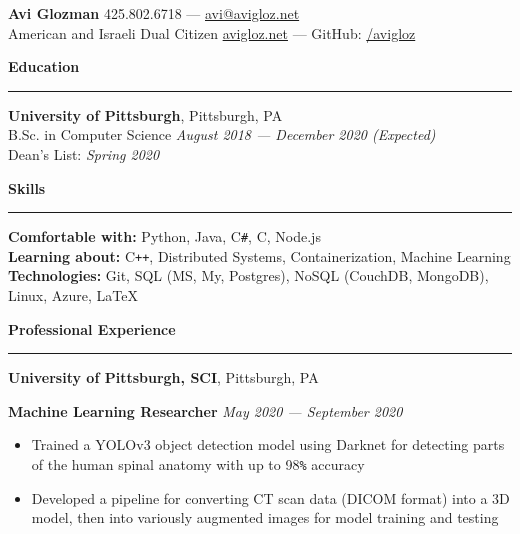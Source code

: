 \documentclass[10pt]{article}
\begin{document}
	\pagestyle{empty}
	\begin{center}
		{\huge \textbf{Avi Glozman}} {\large \hfill 425.802.6718 --- \href{mailto:avi@avigloz.net}{avi@avigloz.net}}\\
		\vspace{1.25mm}
		{\large American and Israeli Dual Citizen \hfill \href{https://avigloz.net}{avigloz.net} --- GitHub: \href{https://github.com/avigloz}{/avigloz}}
	\end{center}
	
	\begin{flushleft}	
		\vspace{-1.65mm}
		{\large \raggedright \textbf{Education}}
		\vspace{1.25mm}
	
		\hrule
		
		\vspace{2.25mm}
		\textbf{University of Pittsburgh}, Pittsburgh, PA\\
      {\small B.Sc. in Computer Science \hfill \textit{August 2018 --- December 2020 (Expected)}}\\
		{\small Dean's List: \textit{Spring 2020}}
	
		\vspace{1.25mm} 
		{\large \raggedright \textbf{Skills}}
		\vspace{1.25mm}
	
		\hrule
	
		\vspace{2.25mm}
		\textbf{Comfortable with:} Python, Java, C\verb!#!, C, Node.js\\
		\vspace{0.5mm}
		\textbf{Learning about:} C\texttt{++}, Distributed Systems, Containerization, Machine Learning\\
		\vspace{0.5mm}
		\textbf{Technologies:} Git, SQL (MS, My, Postgres), NoSQL (CouchDB, MongoDB), Linux, Azure, \LaTeX\\

		\vspace{1.5mm}
		{\large \raggedright \textbf{Professional Experience}}
		\vspace{1.25mm}
	
		\hrule

		\vspace{2.25mm}
		\textbf{University of Pittsburgh, SCI}, Pittsburgh, PA\\
		\begin{leftli}
         {\small \textbf{Machine Learning Researcher}} \hfill \textit{\small May 2020 --- September 2020}
			\begin{itemize}
				\item Trained a YOLOv3 object detection model using Darknet for detecting parts of the human spinal anatomy with up to 98\verb!%! accuracy
				\vspace{-2mm}
				\item Developed a pipeline for converting CT scan data (DICOM format) into a 3D model, then into variously augmented images for model training and testing
			\end{itemize}
		\end{leftli}


\end{flushleft}
\end{document}
